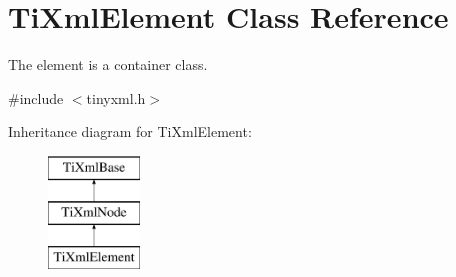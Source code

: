 \hypertarget{class_ti_xml_element}{
\section{TiXmlElement Class Reference}
\label{class_ti_xml_element}
}


The element is a container class.  




{\ttfamily \#include $<$tinyxml.h$>$}

Inheritance diagram for TiXmlElement:\begin{figure}[H]
\begin{center}
\leavevmode
\includegraphics[height=3.000000cm]{class_ti_xml_element}
\end{center}
\end{figure}
